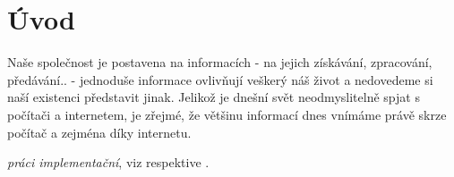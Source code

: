 \chapter{Úvod}
Naše společnost je postavena na informacích - na jejich získávání, zpracování, předávání.. - jednoduše informace ovlivňují veškerý náš život 
a nedovedeme si naší existenci představit jinak. 
Jelikož je dnešní svět neodmyslitelně spjat s počítači a internetem, je zřejmé, že většinu informací dnes vnímáme právě skrze počítač a zejména díky internetu.

 

 \textit{práci implementační}, viz \cite{infodp} respektive \cite{infobp}.
